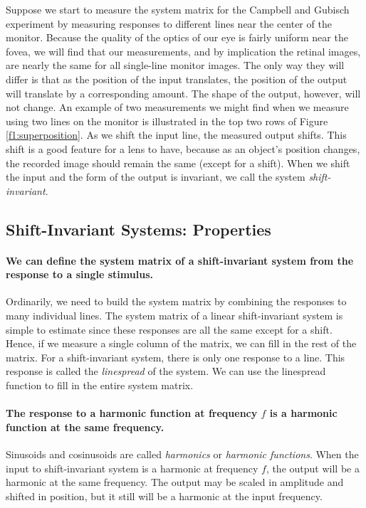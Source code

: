 Suppose we start to measure the system matrix for the
Campbell and Gubisch experiment by
measuring responses to different
lines near the center of the monitor.
Because the quality of the optics of our eye is fairly
uniform near the fovea,
we will find that our measurements,
and by implication the retinal images,
are nearly the same for all single-line monitor images.
The only way they will differ is that as
the position of the input translates,
the position of the output will translate by a corresponding amount.
The shape of the output, however, will not change.
An example of two measurements we might find
when we measure using two
lines on the monitor is illustrated 
in the top two rows of Figure \ref{f1:superposition}.
As we shift the input line, the measured output shifts.
This shift is a good feature for a lens to have,
because as an object's position changes,
the recorded image should remain the same (except for a shift).
When we shift the input and the form of the
output is invariant,
we call the system {\em shift-invariant}.

\subsection*{Shift-Invariant Systems:  Properties}
\paragraph{We can define the system matrix of a shift-invariant
system from the response to a single stimulus.}
Ordinarily, we need to build the system matrix
by combining the responses to many individual lines.
The system matrix of a linear shift-invariant system  
is simple to estimate since these responses are all the same
except for a shift.
Hence, if we measure a single column of the matrix, we can
fill in the rest of the matrix.
For a shift-invariant system, there is only one response
to a line.
This response is called the {\em linespread} of the system.
We can use the linespread function to fill in the entire
system matrix.

\paragraph{The response to a harmonic function at frequency $f$
is a harmonic function at the same frequency. }
Sinusoids and cosinusoids are called {\em harmonics}
or {\em harmonic functions}.
When the input to shift-invariant system is a
harmonic at frequency $f$,
the output will be a harmonic at the same frequency.
The output may be scaled in amplitude and shifted in position,
but it still will be a harmonic at the input frequency.

